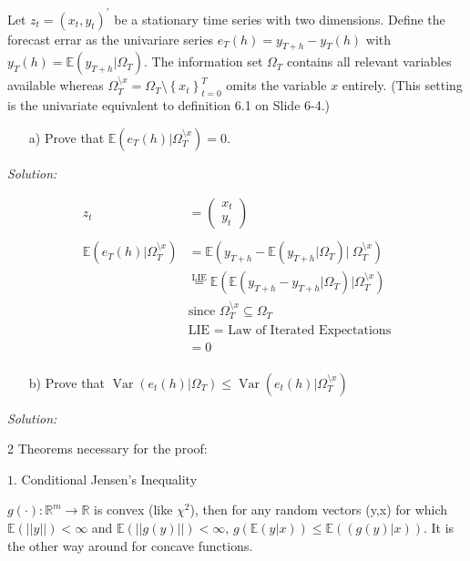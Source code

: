 \documentclass[12pt,a4paper]{article}
\newcommand{\Var}{\operatorname{Var}} %
\begin{document}
Let \(z_t = (x_t, y_t)^{'}\) be a stationary time series with two
dimensions. Define the forecast errar as the univariare series
\(e_T (h) = y_{T +h} - y_T (h)\) with
\(y_T (h) = \mathbb{E} \left( y_{T + h} | \Omega_T \right)\). The
information set \(\Omega_T\) contains all relevant variables available
whereas
\(\Omega^{\setminus x}_{T} = \Omega_T \setminus \left\{ x_t\right\}_{t = 0}^{T}\)
omits the variable \(x\) entirely. (This setting is the univariate
equivalent to definition 6.1 on Slide 6-4.)

\begin{itemize}
  \item[a)] Prove that $\mathbb{E} \left( e_T(h) | \Omega_{T}^{\setminus x} \right) = 0$.
\end{itemize}

\emph{Solution:}

\begin{align*}
  z_t & = \begin{pmatrix} x_t \\ y_t \end{pmatrix}\\
  \\
  \mathbb{E} \left( e_T (h) | \Omega_{T}^{\setminus x} \right) & = \mathbb{E} \left( y_{T + h} - \mathbb{E} \left( y_{T +h} | \Omega_T \right) | \ \Omega_{T}^{\setminus x} \right)\\
  & \overset{\text{LIE}}{=} \mathbb{E} \left( \mathbb{E} \left( y_{T +h} - y_{T + h}| \Omega_T \right) | \Omega_{T}^{\setminus x} \right)\\
  & \text{since } \Omega_{T}^{\setminus x} \subseteq \Omega_{T}  \\
  & \text{LIE = Law of Iterated Expectations}\\
  & = 0\\
\end{align*}

\begin{itemize}
  \item[b)] Prove that $\Var \left(e_t (h)| \Omega_T \right) \leq \Var \left(e_t (h)| \Omega_T^{\setminus x} \right)$
\end{itemize}

\emph{Solution:}

2 Theorems necessary for the proof:

\(1.\) Conditional Jensen's Inequality

\(g(\cdot ): \mathbb{R}^{m} \rightarrow \mathbb{R}\) is convex (like
\(\chi^2\)), then for any random vectors (y,x) for which
\(\mathbb{E} (||y||) < \infty\) and \(\mathbb{E} (|| g(y)||)< \infty\),
\(g \left( \mathbb{E} (y|x) \right) \leq \mathbb{E} \left( (g(y)|x) \right)\).
It is the other way around for concave functions.
\end{document}
